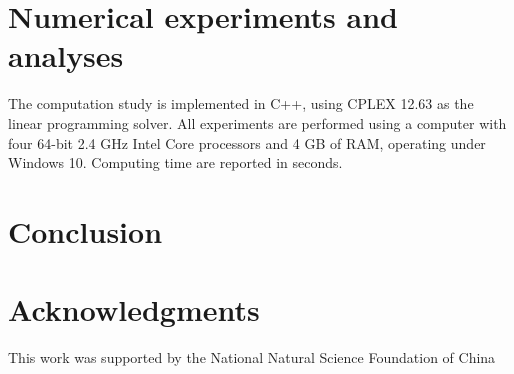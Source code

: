 \documentclass[11pt,nonblindrev,fleqn]{article}
\begin{document}
\section{Numerical experiments and analyses}
The computation study is implemented in C++, using CPLEX 12.63 as the linear programming solver. All experiments are performed using a computer with four 64-bit 2.4 GHz Intel Core processors and 4 GB of RAM, operating under Windows 10. Computing time are reported in seconds.

\section{Conclusion}

\section*{Acknowledgments}

This work was supported by the National Natural Science Foundation of China
\end{document}
